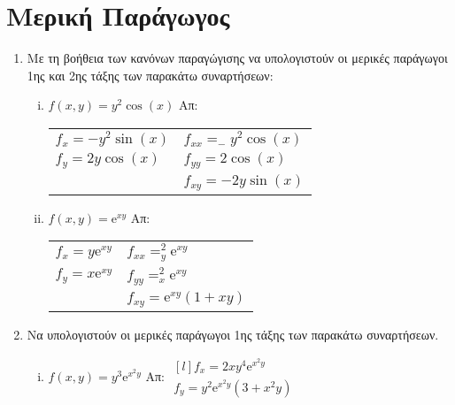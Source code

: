 \documentclass[a4paper,table]{report}
\begin{document}
\begin{center}
  \minibox{{\large\bfseries \textcolor{Col1}{Ασκήσεις στις Μερικές Παραγώγους}}}
\end{center}


\section*{Μερική Παράγωγος}

\begin{enumerate}

  \item Με τη βοήθεια των κανόνων παραγώγισης να υπολογιστούν οι μερικές 
    παράγωγοι 1ης και 2ης  τάξης των παρακάτω συναρτήσεων:
    \begin{enumerate}[i)]
      \item $f(x,y)=y^2\cos (x)$ \hfill Απ: \begin{tabular}{ll}
          $f_x=-y^2\sin(x)$ & $f_{xx}=_-y^2\cos(x)$ \\
          $f_y=2y\cos(x)$ & $f_{yy}=2\cos(x)$ \\
                          & $f_{xy}=-2y\sin(x)$ 
        \end{tabular}

      \item $f(x,y)= \mathrm{e}^{xy}$ \hfill Απ: \begin{tabular}{ll}
          $f_x= y \mathrm{e}^{xy} $ & $f_{xx}=_y^2 \mathrm{e}^{xy} $ \\
          $f_y= x \mathrm{e}^{xy} $ & $f_{yy}=_x^2 \mathrm{e}^{xy} $ \\
                                    & $f_{xy}= \mathrm{e}^{xy} (1+xy) $
        \end{tabular}
    \end{enumerate}

  \item Να υπολογιστούν οι μερικές παράγωγοι 1ης τάξης των παρακάτω συναρτήσεων.

    \begin{enumerate}[i)]
      \item $ f(x,y) = y^{3} \mathrm{e}^{x^{2}y} $ \hfill Απ: $ 
        \begin{matrix*}[l]
          f_{x} = 2xy^{4} \mathrm{e}^{x^{2}y} \\ 
          f_{y} = y^{2} \mathrm{e}^{x^{2}y} (3+x^{2}y) 
        \end{matrix*} $



\end{enumerate}
\end{enumerate}
\end{document}

